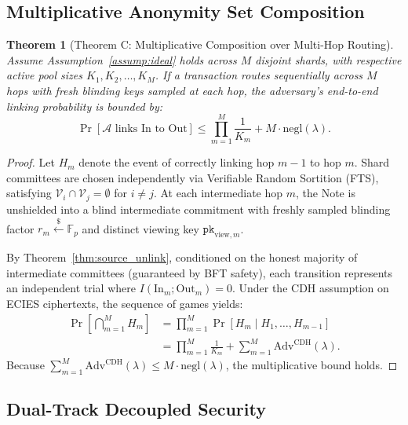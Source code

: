 \documentclass[journal,10pt,twocolumn]{IEEEtran}
\newtheorem{theorem}{Theorem}
\theoremstyle{definition}
\theoremstyle{remark}
\begin{document}
\subsection{Multiplicative Anonymity Set Composition}

\begin{theorem}[Theorem C: Multiplicative Composition over Multi-Hop Routing]\label{thm:multiplicative}
Assume Assumption~\ref{assump:ideal} holds across $M$ disjoint shards, with respective active pool sizes $K_1, K_2, \dots, K_M$. If a transaction routes sequentially across $M$ hops with fresh blinding keys sampled at each hop, the adversary's end-to-end linking probability is bounded by:
\begin{equation}
\Pr[\mathcal{A} \text{ links In to Out}] \le \prod_{m=1}^M \frac{1}{K_m} + M \cdot \text{negl}(\lambda).
\end{equation}
\end{theorem}

\begin{proof}
Let $H_m$ denote the event of correctly linking hop $m-1$ to hop $m$. Shard committees are chosen independently via Verifiable Random Sortition (FTS), satisfying $\mathcal{V}_i \cap \mathcal{V}_j = \emptyset$ for $i \neq j$. At each intermediate hop $m$, the Note is unshielded into a blind intermediate commitment with freshly sampled blinding factor $r_m \xleftarrow{\$} \mathbb{F}_p$ and distinct viewing key $\mathtt{pk}_{\text{view}, m}$.

By Theorem~\ref{thm:source_unlink}, conditioned on the honest majority of intermediate committees (guaranteed by BFT safety), each transition represents an independent trial where $I(\text{In}_m; \text{Out}_m) = 0$. Under the CDH assumption on ECIES ciphertexts, the sequence of games yields:
\begin{align}
\Pr\left[\bigcap_{m=1}^M H_m\right] &= \prod_{m=1}^M \Pr[H_m \mid H_1, \dots, H_{m-1}] \nonumber \\
&= \prod_{m=1}^M \frac{1}{K_m} + \sum_{m=1}^M \text{Adv}^{\text{CDH}}(\lambda).
\end{align}
Because $\sum_{m=1}^M \text{Adv}^{\text{CDH}}(\lambda) \le M \cdot \text{negl}(\lambda)$, the multiplicative bound holds.
\end{proof}

\subsection{Dual-Track Decoupled Security}
\end{document}
